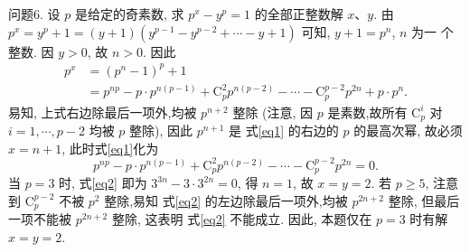 问题6. 设 $p$ 是给定的奇素数, 求 $p^x-y^p=1$ 的全部正整数解 $x 、 y$.
由 $p^x=y^p+1=(y+1)\left(y^{p-1}-y^{p-2}+\cdots-y+1\right)$ 可知, $y+1=p^n$, $n$ 为一 个整数.
因 $y>0$, 故 $n>0$. 因此
$$
\begin{aligned}
p^x & =\left(p^n-1\right)^p+1 \\
& =p^{n p}-p \cdot p^{n(p-1)}+\mathrm{C}_p^2 p^{n(p-2)}-\cdots-\mathrm{C}_p^{p-2} p^{2 n}+p \cdot p^n . \label{eq1}
\end{aligned}
$$
易知, 上式右边除最后一项外,均被 $p^{n+2}$ 整除 (注意, 因 $p$ 是素数,故所有 $\mathrm{C}_p^i$ 对 $i=1, \cdots, p-2$ 均被 $p$ 整除), 因此 $p^{n+1}$ 是 式\ref{eq1} 的右边的 $p$ 的最高次幂, 故必须 $x=n+1$, 此时式\ref{eq1}化为
$$
p^{n p}-p \cdot p^{n(p-1)}+\mathrm{C}_p^2 p^{n(p-2)}-\cdots-\mathrm{C}_p^{p-2} p^{2 n}=0 . \label{eq2}
$$
当 $p=3$ 时, 式\ref{eq2} 即为 $3^{3 n}-3 \cdot 3^{2 n}=0$, 得 $n=1$, 故 $x=y=2$. 若 $p \geqslant 5$, 注意到 $\mathrm{C}_p^{p-2}$ 不被 $p^2$ 整除,易知 式\ref{eq2} 的左边除最后一项外,均被 $p^{2 n+2}$ 整除, 但最后一项不能被 $p^{2 n+2}$ 整除, 这表明 式\ref{eq2} 不能成立.
因此, 本题仅在 $p=3$ 时有解 $x=y=2$.


